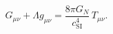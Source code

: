 \setcounter{equation}{45}
\begin{equation}
G_{\mu\nu}+\Lambda g_{\mu\nu}
=\frac{8\pi G_N}{c_{\mathrm{SI}}^4}\,T_{\mu\nu}.
\end{equation}
